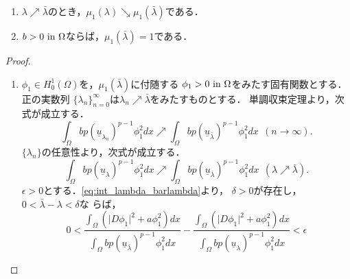 \begin{lem} \label{lem:mu_1_bar_lambda}
 \begin{enumerate}[1.] \sage
  \item $\lambda \nearrow \bar{\lambda}$のとき，$\mu_1(\lambda)
        \searrow \mu_1(\bar{\lambda})$である．
  \item $b > 0 ~\text{in}~ \Omega$ならば，$\mu_1(\bar{\lambda}) = 1$である．
 \end{enumerate}
\end{lem}
\begin{proof}
 \begin{enumerate}[1.] \sage
  \item $\phi_1 \in H_0^1(\Omega)$を，$\mu_1(\bar{\lambda})$に付随する
        $\phi_1 > 0 ~\text{in}~ \Omega$をみたす固有関数とする．
        正の実数列
        $\{\lambda_n \}_{n=0}^\infty$は$\lambda_n
        \nearrow \bar{\lambda}$をみたすものとする．
        単調収束定理より，次式が成立する．
        \[
         \int_\Omega bp ( \underline{u}_{\lambda_n} )^{p-1} \phi_1^2
          dx \nearrow \int_\Omega bp
          (\underline{u}_{\bar{\lambda}})^{p-1} \phi_1^2 dx  \ \ (n
        \to \infty).        
        \]
        $\{\lambda_n \}$の任意性より，次式が成立する．
        \begin{equation}
         \int_\Omega bp ( \underline{u}_{\lambda} )^{p-1} \phi_1^2
          dx \nearrow \int_\Omega bp
          (\underline{u}_{\bar{\lambda}})^{p-1} \phi_1^2 dx
           \ \ (\lambda \nearrow \bar{\lambda}).
          \label{eq:int_lambda_barlambda}
        \end{equation}
        $\epsilon > 0$とする．\eqref{eq:int_lambda_barlambda}より，
        $\delta > 0$が存在し，$0 < \bar{\lambda} - \lambda < \delta$な
        らば，
        \begin{equation}
         0 < \frac{\displaystyle \int_\Omega \left( \lvert D\phi_1
                                              \rvert^2
                                              + a
                                             \phi_1^2\right) dx}
         {\displaystyle 
         \int_\Omega bp (\underline{u}_{\bar{\lambda}})^{p-1} \phi_1^2 dx}
         -
         \frac{\displaystyle \int_\Omega \left( \lvert D\phi_1
                                              \rvert^2
                                              + a
                                             \phi_1^2\right) dx}
         {\displaystyle 
         \int_\Omega bp (\underline{u}_{\lambda})^{p-1} \phi_1^2
         dx} < \epsilon \label{eq:zero_int_epsilon}
        \end{equation}

\end{enumerate}
\end{proof}
